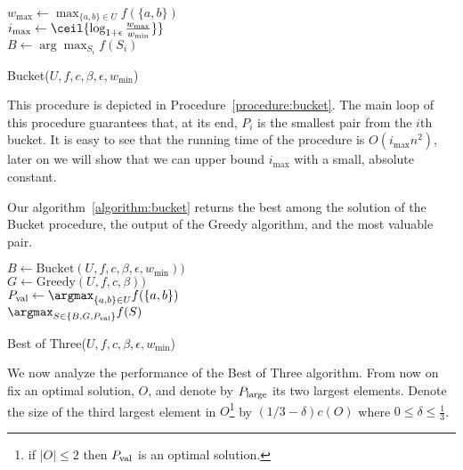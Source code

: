 \begin{procedure}
	$w_{\max} \leftarrow \max_{\{a, b\} \in U}f(\{a, b\})$
	\\
	$i_{\max} \leftarrow \ceil{\log_{1 + \epsilon}\frac{w_{\max}}{w_{\min}}\}}$
	\\
	$B \leftarrow \arg\max_{S_i}f(S_i)$
	\\
	\caption{Bucket($U, f, c, \beta, \epsilon, w_{\min}$)}
	\label{procedure:bucket}
\end{procedure}

This procedure is depicted in Procedure~\ref{procedure:bucket}.
The main loop of this procedure guarantees that, at its end, $P_i$ is the smallest pair from the $i$th bucket.
It is easy to see that the running time of the procedure is $O(i_{\max}n^2)$,
later on we will show that we can upper bound $i_{\max}$ with a small, absolute constant.

Our algorithm~\ref{algorithm:bucket} returns the best among the solution of the Bucket procedure, the output of the Greedy algorithm, and the most valuable pair.

\begin{algorithm}
	$B \leftarrow \text{Bucket}(U, f, c, \beta, \epsilon, w_{\min}))$
	\\
	$G \leftarrow \text{Greedy}(U, f, c, \beta))$
	\\
	$\pVal \leftarrow \argmax_{\{a, b\}\in U}f(\{a, b\})$
	\\
	\Return $\argmax_{S \in \{B, G, \pVal\}}f(S)$
	\caption{Best of Three($U, f, c, \beta, \epsilon, w_{\min}$)}
	\label{algorithm:bucket}
\end{algorithm}

We now analyze the performance of the Best of Three algorithm.
From now on fix an optimal solution, $O$, and denote by $P_{\text{large}}$ its two largest elements.
Denote the size of the third largest element in $O$\footnote{if $|O| \leq 2$ then $P_{\text{val}}$ is an optimal solution.} by $(1/3 - \delta)c(O)$ where $0 \leq \delta \leq \frac{1}{3}$.


